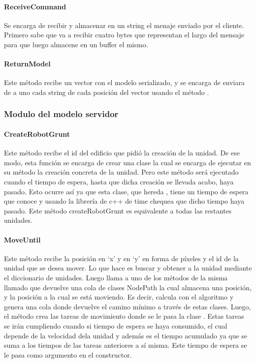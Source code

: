         \paragraph{ReceiveCommand}
            Se encarga de recibir y almacenar en un string el menaje enviado por
            el cliente. Primero sabe que va a recibir cuatro bytes que
            representan el largo del mensaje para que luego almacene en un
            buffer el mismo.
        \paragraph{ReturnModel}
            Este método recibe un vector con el modelo serializado, y se encarga
            de enviara de a uno cada string de cada posición del vector usando
            el método .
    \subsubsection{Modulo del modelo servidor}
        \paragraph{CreateRobotGrunt}
            Este método recibe el id del edificio que pidió la creación de la
            unidad. De ese modo, esta función se encarga de crear una clase
             la cual se encarga de ejecutar en
            su método  la creación concreta de la unidad. Pero
            este método será ejecutado cuando el tiempo de espera, hasta que
            dicha creación se llevada acabo, haya pasado. Esto ocurre así ya
            que esta clase, que hereda , tiene un tiempo de
            espera que conoce y usando la librería de c++ de time chequea que
            dicho tiempo haya pasado. Este método createRobotGrunt es
            equivalente a todas las restantes unidades.
        \paragraph{MoveUntil}
            Este método recibe la posición en ‘x’ y en ‘y’ en forma de píxeles
            y el id de la unidad que se desea mover. Lo que hace es buscar y
            obtener a la unidad mediante el diccionario de unidades. Luego
            llama a uno de los métodos de la misma llamado  que
            devuelve una cola de clases NodePath la cual almacena una
            posición, y la posición a la cual se está moviendo. Es decir,
            calcula con el algoritmo  y genera una cola donde
            devuelve el camino mínimo a través de estas clases. Luego, el método
             crea las tareas de movimiento 
            donde se le pasa la clase . Estas tareas se irán
            cumpliendo cuando si tiempo de espera se haya consumido, el cual
            depende de la velocidad dela unidad y además es el tiempo acumulado
            ya que se suma a los tiempos de las tareas anteriores a sí misma.
            Este tiempo de espera se le pasa como argumento en el constructor.
